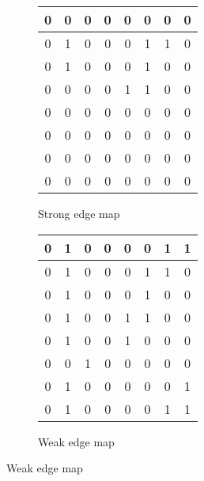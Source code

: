 \documentclass[a4paper]{article}
\begin{document}
\begin{figure}[!h]
	\begin{subfigure}{.5\textwidth}
	\centering
\begin{tabular}{|c|c|c|c|c|c|c|c|}
	\hline
0 & 0 & 0 & 0 & 0 & 0 & 0 & 0 \\ \hline
0 & 1 & 0 & 0 & 0 & 1 & 1 & 0 \\ \hline
0 & 1 & 0 & 0 & 0 & 1 & 0 & 0 \\ \hline
0 & 0 & 0 & 0 & 1 & 1 & 0 & 0 \\ \hline
0 & 0 & 0 & 0 & 0 & 0 & 0 & 0 \\ \hline
0 & 0 & 0 & 0 & 0 & 0 & 0 & 0 \\ \hline
0 & 0 & 0 & 0 & 0 & 0 & 0 & 0 \\ \hline
0 & 0 & 0 & 0 & 0 & 0 & 0 & 0 \\ \hline
\end{tabular}
\caption{Strong edge map}
\end{subfigure}
	\begin{subfigure}{.5\textwidth}
	\centering
\begin{tabular}{|c|c|c|c|c|c|c|c|}
	\hline
0 & 1 & 0 & 0 & 0 & 0 & 1 & 1 \\ \hline
0 & 1 & 0 & 0 & 0 & 1 & 1 & 0 \\ \hline
0 & 1 & 0 & 0 & 0 & 1 & 0 & 0 \\ \hline
0 & 1 & 0 & 0 & 1 & 1 & 0 & 0 \\ \hline
0 & 1 & 0 & 0 & 1 & 0 & 0 & 0 \\ \hline
0 & 0 & 1 & 0 & 0 & 0 & 0 & 0 \\ \hline
0 & 1 & 0 & 0 & 0 & 0 & 0 & 1 \\ \hline
0 & 1 & 0 & 0 & 0 & 0 & 1 & 1 \\ \hline
\end{tabular}
	\caption{Weak edge map}
\end{subfigure}


\end{figure}
\end{document}
